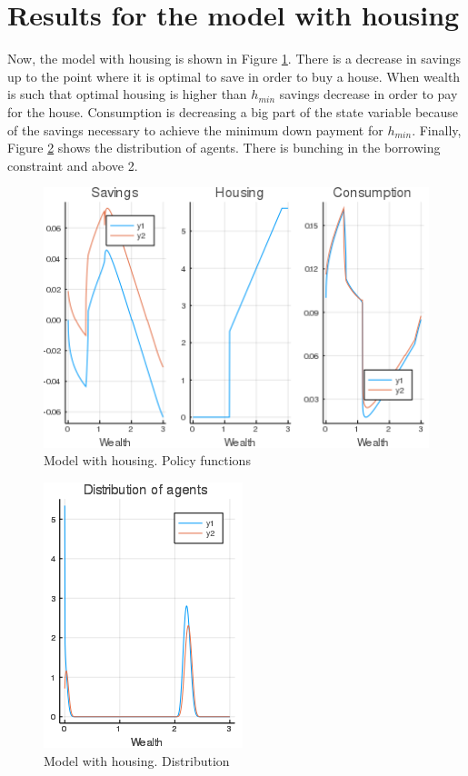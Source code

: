 \documentclass[12pt]{article}
\begin{document}
\section{Results for the model with housing}
Now, the model with housing is shown in Figure \ref{figHPol}. There is a decrease in savings up to the point where it is optimal to save in order to buy a house. When wealth is such that optimal housing is higher than $h_{min}$ savings decrease in order to pay for the house. Consumption is decreasing a big part of the state variable because of the savings necessary to achieve the minimum down payment for $h_{min}$. Finally, Figure \ref{figHDist} shows the distribution of agents. There is bunching in the borrowing constraint and above 2.


\begin{figure}
\center
\includegraphics{HousingPolicies.png} \caption{Model with housing. Policy functions}\label{figHPol}
\end{figure}

\begin{figure}
\center
\includegraphics{HousingDistribution.png} \caption{Model with housing. Distribution}\label{figHDist}
\end{figure}




 
\end{document}
